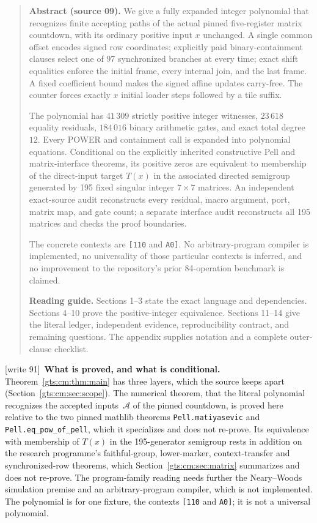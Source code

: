 \documentclass[11pt,letterpaper]{article}
\theoremstyle{definition}
\theoremstyle{remark}
\newcommand{\wtagd}{\textup{[write 91]}}
\begin{document}
\begin{quote}\small
\textbf{Abstract (source 09).} We give a fully expanded integer polynomial that recognizes finite accepting paths of the actual pinned five-register matrix countdown, with its ordinary positive input $x$ unchanged. A single common offset encodes signed row coordinates; explicitly paid binary-containment clauses select one of 97 synchronized branches at every time; exact shift equalities enforce the initial frame, every internal join, and the last frame. A fixed coefficient bound makes the signed affine updates carry-free. The counter forces exactly $x$ initial loader steps followed by a tile suffix.

The polynomial has $41\,309$ strictly positive integer witnesses, $23\,618$ equality residuals, $184\,016$ binary arithmetic gates, and exact total degree $12$. Every POWER and containment call is expanded into polynomial equations. Conditional on the explicitly inherited constructive Pell and matrix-interface theorems, its positive zeros are equivalent to membership of the direct-input target $T(x)$ in the associated directed semigroup generated by 195 fixed singular integer $7\times7$ matrices. An independent exact-source audit reconstructs every residual, macro argument, port, matrix map, and gate count; a separate interface audit reconstructs all 195 matrices and checks the proof boundaries.

The concrete contexts are \texttt{[110} and \texttt{A0]}. No arbitrary-program compiler is implemented, no universality of those particular contexts is inferred, and no improvement to the repository's prior 84-operation benchmark is claimed.

\medskip
\textbf{Reading guide.} Sections 1--3 state the exact language and dependencies. Sections 4--10 prove the positive-integer equivalence. Sections 11--14 give the literal ledger, independent evidence, reproducibility contract, and remaining questions. The appendix supplies notation and a complete outer-clause checklist.
\end{quote}

\wtagd\ \textbf{What is proved, and what is conditional.} Theorem~\ref{gts:cm:thm:main} has three layers, which the source keeps apart (Section~\ref{gts:cm:sec:scope}). The numerical theorem, that the literal polynomial recognizes the accepted inputs~$\mathcal A$ of the pinned countdown, is proved here relative to the two pinned mathlib theorems \texttt{Pell.matiyasevic} and \texttt{Pell.eq\_pow\_of\_pell}, which it specializes and does not re-prove. Its equivalence with membership of $T(x)$ in the 195-generator semigroup rests in addition on the research programme's faithful-group, lower-marker, context-transfer and synchronized-row theorems, which Section~\ref{gts:cm:sec:matrix} summarizes and does not re-prove. The program-family reading needs further the Neary--Woods simulation premise and an arbitrary-program compiler, which is not implemented. The polynomial is for one fixture, the contexts \texttt{[110} and \texttt{A0]}; it is not a universal polynomial.
\end{document}
